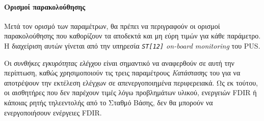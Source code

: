 \documentclass[a4paper,nobib]{tufte-book}
\begin{document}
\paragraph{Ορισμοί παρακολούθησης}

Μετά τον ορισμό των παραμέτρων, θα πρέπει να περιγραφούν οι ορισμοί παρακολούθησης που καθορίζουν τα αποδεκτά και μη εύρη τιμών για κάθε παράμετρο. Η διαχείριση αυτών γίνεται από την υπηρεσία \emph{\texttt{ST[12]} on-board monitoring} του \ac{PUS}.

Οι \emph{συνθήκες εγκυρότητας ελέγχου} είναι σημαντικό να αναφερθούν σε αυτή την περίπτωση, καθώς χρησιμοποιούν τις τρεις παραμέτρους \emph{Κατάστασης} του  για να αποτρέψουν την εκτέλεση ελέγχων σε απενεργοποιημένα περιφερειακά. Ως εκ τούτου, οι αισθητήρες που δεν παρέχουν τιμές λόγω προβλημάτων υλικού, ενεργειών \ac{FDIR} ή κάποιας ρητής τηλεεντολής από το Σταθμό Βάσης, δεν θα μπορούν να ενεργοποιήσουν ενέργειες \ac{FDIR}.
\end{document}
